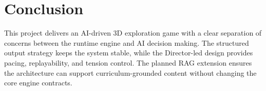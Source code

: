 \documentclass[12pt]{article}
\begin{document}
\section*{Conclusion}
This project delivers an AI-driven 3D exploration game with a clear separation of concerns between the runtime engine and AI decision making. The structured output strategy keeps the system stable, while the Director-led design provides pacing, replayability, and tension control. The planned RAG extension ensures the architecture can support curriculum-grounded content without changing the core engine contracts.
\end{document}
